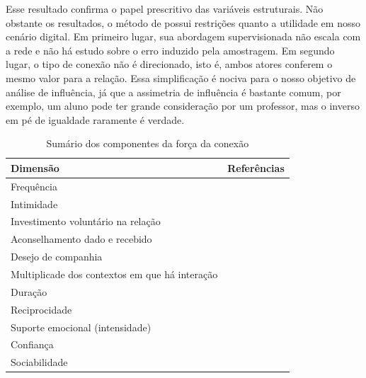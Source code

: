 Esse resultado confirma o papel prescritivo das variáveis estruturais. Não
obstante os resultados, o método de \citet{Gilbert2009} possui restrições quanto
a utilidade em nosso cenário digital. Em primeiro lugar, sua abordagem
supervisionada não escala com a rede e não há estudo sobre o erro induzido pela
amostragem. Em segundo lugar, o tipo de conexão não é direcionado, isto é, ambos
atores conferem o mesmo valor para a relação. Essa simplificação é nociva para o
nosso objetivo de análise de influência, já que a assimetria de influência é
bastante comum, por exemplo, um aluno pode ter grande consideração por um
professor, mas o inverso em pé de igualdade raramente é verdade.

\begin{table} [htbp]
	\large       %
	\setlength{\arrayrulewidth}{2\arrayrulewidth}  %
	\setlength{\belowcaptionskip}{10pt}  %
	\caption{Sumário dos componentes da força da conexão
	\citep{Petroczi2006}} \centering   %
	\begin{tabular}{| p{4cm} | p{8cm} |}
	\hline
	\textbf{Dimensão} & \textbf{Referências} \\ \hline\hline
	Frequência & \citet{Benassi1999, Blumstein1988, Granovetter1995,
	Marsden1984, MATHEWS1998, Mitchell1987, Perlman1987} \\\hline
	Intimidade & \citet{Blumstein1988, Marsden1984, MATHEWS1998, Mitchell1987,
	Perlman1987}\\\hline 
	Investimento voluntário na relação & \citet{Blumstein1988, Perlman1987}\\\hline
	Aconselhamento dado e recebido & \citet{MATHEWS1998}\\\hline 
	Desejo de companhia & \citet{Blumstein1988, Perlman1987}\\\hline 
	Multiplicade dos contextos em que há interação & \citet{Blumstein1988,
	Granovetter1973, Marsden1984, Perlman1987}\\\hline 
	Duração & \citet{Blumstein1988, Granovetter1973, Marsden1984,
	Perlman1987}\\\hline 
	Reciprocidade & \citet{Blumstein1988, Friedkin1980, Granovetter1973,
	MATHEWS1998, Perlman1987}\\\hline 
	Suporte	emocional (intensidade) & \citet{Blumstein1988, Granovetter1973,
	Mitchell1987, Perlman1987, Wellman1982, Wellman1990}\\\hline
	Confiança & \citet{Granovetter1973, Marsden1984, MATHEWS1998}\\\hline
	Sociabilidade & \citet{Mitchell1987}\\
	\hline
	\end{tabular}
	\label{tab:resumao}
\end{table}

